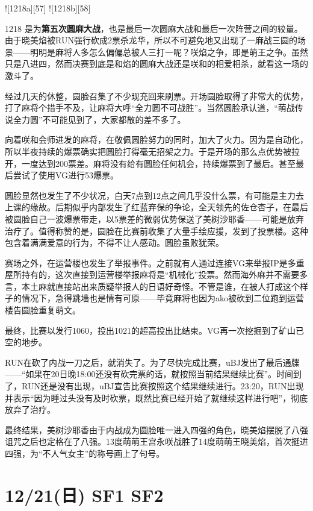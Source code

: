 ![1218a][57]
![1218b][58]

1218 是为\textbf{第五次圆麻大战}，也是最后一次圆麻大战和最后一次阵营之间的较量。由于晓美焰被RUN强行砍成2票杀龙华，所以不可避免地又出现了一麻战三圆的场景——明明是麻将人多怎么偏偏总被人三打一呢？咲焰之争，即是萌王之争。虽然只是八进四，然而决赛到底是和焰的圆麻大战还是咲和的相爱相杀，就看这一场的激斗了。

经过几天的休整，圆脸召集了不少现充回来刷票。开场圆脸取得了非常大的优势，打了麻将个措手不及，让麻将大呼“全力圆不可战胜”。当然圆脸承认道，“萌战传说全力圆”不可能见到了，大家都散的差不多了。

向着咲和会师进发的麻将，在敬佩圆脸努力的同时，加大了火力。因为是自动化，所以半夜持续的爆票确实把圆脸打得毫无招架之力。于是开场的那么点优势被拉开，一度达到200票差。麻将没有给有圆脸任何机会，持续爆票到了最后。甚至最后尝试了使用VG进行53爆票。

圆脸显然也发生了不少状况，白天7点到12点之间几乎没什么票，有可能是主力去上课的缘故。后期似乎内部发生了红蓝弃保的争论，全天领先的佐仓杏子，在最后被圆脸自己一波爆票带走，以5票差的微弱优势保送了美树沙耶香——可能是放弃治疗了。值得称赞的是，圆脸在比赛前收集了大量手绘应援，发到了投票楼。这种包含着满满爱意的行为，不得不让人感动。圆脸虽败犹荣。

赛场之外，在运营楼也发生了举报事件。之前就有人通过连接VG来举报IP是多重屋所持有的，这次直接到运营楼举报麻将是“机械化”投票。然而海外麻并不需要多言，本土麻就直接站出来质疑举报人的日语好奇怪。不管是谁，在被人打成这个样子的情况下，急得跳墙也是情有可原——毕竟麻将也因为ako被砍到二位跑到运营楼告圆脸重复萌文。

最终，比赛以发行1060，投出1021的超高投出比结束。VG再一次挖掘到了矿山已空的地步。

RUN在砍了内战一刀之后，就消失了。为了尽快完成比赛，uBJ发出了最后通牒——“如果在20日晚18:00还没有砍完票的话，就按照当前结果继续比赛”。时间到了，RUN还是没有出现，uBJ宣告比赛按照这个结果继续进行。23:20，RUN出现并表示“因为睡过头没有及时砍票，既然比赛已经开始了就继续这样进行吧”，彻底放弃了治疗。

最终结果，美树沙耶香由于内战成为圆脸唯一进入四强的角色，晓美焰摆脱了八强诅咒之后也定格在了八强。13度萌萌王宫永咲战胜了14度萌萌王晓美焰，首次挺进四强，为“不人气女主”的称号画上了句号。

\section{12/21(日) SF1 SF2}


